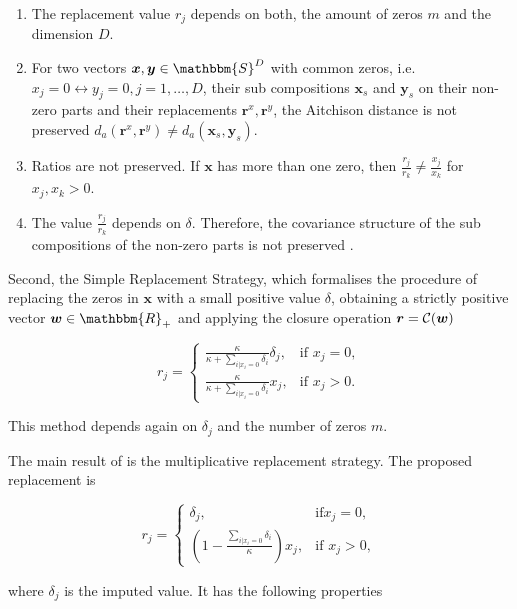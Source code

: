 \begin{enumerate}
	\item The replacement value $r_j$ depends on both, the amount of zeros $m$ and the dimension $D$.
	\item For two vectors $\bm{x},\bm{y} \in \mathbbm{S}^D$ with common zeros, i.e. $x_j= 0 \leftrightarrow y_j=0, j=1,\ldots,D$, their sub compositions $\bm{x}_s$ and $\bm{y}_s$  on their non-zero parts and their replacements $\bm{r}^x,\bm{r}^y$, the Aitchison distance is not preserved $d_a(\bm{r}^x,\bm{r}^y) \neq d_a(\bm{x}_s,\bm{y}_s)$. 
	\item Ratios are not preserved. If $\bm{x}$ has more than one zero, then $\frac{r_j}{r_k} \neq \frac{x_j}{x_k}$ for $x_j,x_k > 0$.
	\item The value $\frac{r_j}{r_k}$ depends on $\delta$. Therefore, the covariance structure of the sub compositions of the non-zero parts is not preserved \cite{Josep:2003}.
\end{enumerate}

Second, the Simple Replacement Strategy, which formalises the procedure of replacing the zeros in $\bm{x}$ with a small positive value $\delta$, obtaining a strictly positive vector $\bm{w} \in \mathbbm{R}_+$ and applying the closure operation $\bm{r}=\mathcal{C}(\bm{w})$

\begin{equation}
r_j = 
\begin{cases}
\frac{\kappa}{\kappa + \sum_{i| x_i=0}\delta_i } \delta_j, & \text{if } x_j=0, \\
\frac{\kappa}{\kappa + \sum_{i| x_i=0}\delta_i } x_j, & \text{if } x_j>0.
\end{cases}
\label{eq:simple replacement strategy}
\end{equation}

This method depends again on $\delta_j$ and the number of zeros $m$. 

The main result of \cite{Josep:2003} is the multiplicative replacement strategy. The proposed replacement is 

\begin{equation}
r_j = 
\begin{cases}
\delta_j, & \text{if} x_j=0, \\
\left( 1- \frac{\sum_{i | x_i=0}\delta_i}{\kappa} \right)x_j, & \text{if } x_j>0, 
\end{cases}
\label{eq:multiplicative replacement strategy}
\end{equation}

where $\delta_j$ is the imputed value. It has the following properties

